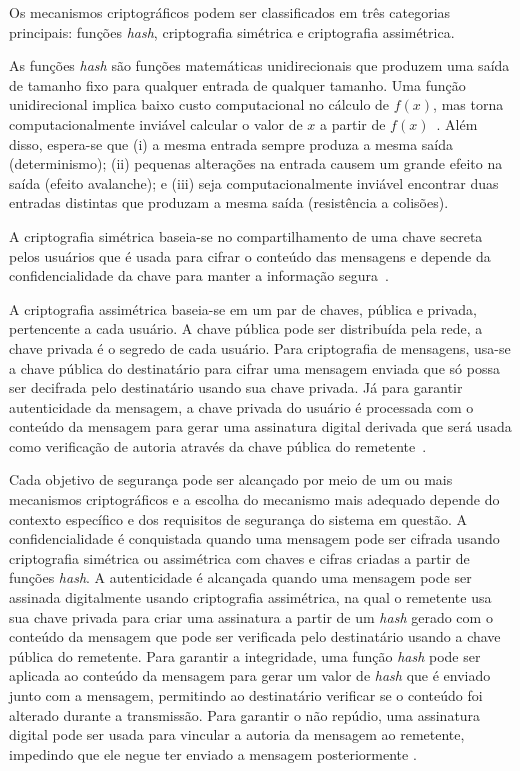 Os mecanismos criptográficos podem ser classificados em três categorias principais: funções \textit{hash}, criptografia simétrica e criptografia assimétrica.

As funções \textit{hash} são funções matemáticas unidirecionais que produzem uma saída de tamanho fixo para qualquer entrada de qualquer tamanho. Uma função unidirecional implica baixo custo computacional no cálculo de $f(x)$, mas torna computacionalmente inviável calcular o valor de $x$ a partir de $f(x)$~\cite{stallings2005cryptography,paar2010understanding}. Além disso, espera-se que (i) a mesma entrada sempre produza a mesma saída (determinismo); (ii) pequenas alterações na entrada causem um grande efeito na saída (efeito avalanche); e (iii) seja computacionalmente inviável encontrar duas entradas distintas que produzam a mesma saída (resistência a colisões). 

A criptografia simétrica baseia-se no compartilhamento de uma chave secreta pelos usuários que é usada para cifrar o conteúdo das mensagens e depende da confidencialidade da chave para manter a informação segura~\cite{barker2020nist}. 

A criptografia assimétrica baseia-se em um par de chaves, pública e privada, pertencente a cada usuário. A chave pública pode ser distribuída pela rede, a chave privada é o segredo de cada usuário. Para criptografia de mensagens, usa-se a chave pública do destinatário para cifrar uma mensagem enviada que só possa ser decifrada pelo destinatário usando sua chave privada. Já para garantir autenticidade da mensagem, a chave privada do usuário é processada com o conteúdo da mensagem para gerar uma assinatura digital derivada que será usada como verificação de autoria através da chave pública do remetente~\cite{barker2020nist}. 

Cada objetivo de segurança pode ser alcançado por meio de um ou mais mecanismos criptográficos e a escolha do mecanismo mais adequado depende do contexto específico e dos requisitos de segurança do sistema em questão. A confidencialidade é conquistada quando uma mensagem pode ser cifrada usando criptografia simétrica ou assimétrica com chaves e cifras criadas a partir de funções \textit{hash}. A autenticidade é alcançada quando uma mensagem pode ser assinada digitalmente usando criptografia assimétrica, na qual o remetente usa sua chave privada para criar uma assinatura a partir de um \textit{hash} gerado com o conteúdo da mensagem que pode ser verificada pelo destinatário usando a chave pública do remetente. Para garantir a integridade, uma função \textit{hash} pode ser aplicada ao conteúdo da mensagem para gerar um valor de \textit{hash} que é enviado junto com a mensagem, permitindo ao destinatário verificar se o conteúdo foi alterado durante a transmissão. Para garantir o não repúdio, uma assinatura digital pode ser usada para vincular a autoria da mensagem ao remetente, impedindo que ele negue ter enviado a mensagem posteriormente \cite{van2025distributed,stallings2005cryptography}.

